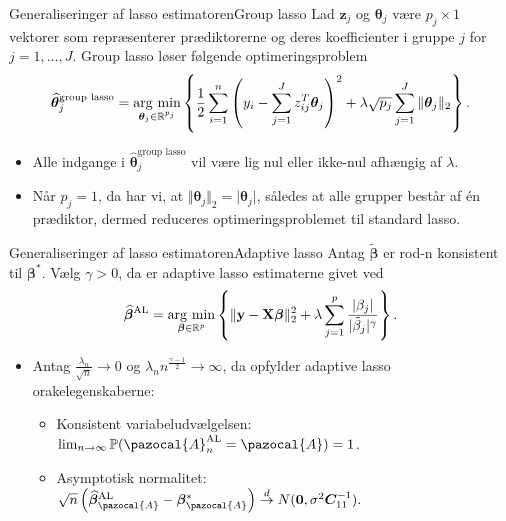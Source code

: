 \begin{frame}{Generaliseringer af lasso estimatoren}{Group lasso}
Lad \(\mathbf{z}_j\) og \(\boldsymbol{\theta}_j\) være \(p_j \times 1\) vektorer som repræsenterer prædiktorerne og deres koefficienter i gruppe \(j\) for \(j = 1, \ldots, J\).
Group lasso løser følgende optimeringsproblem
\begin{align*}
\widehat{\boldsymbol{\theta}}_j^{\text{group lasso}} = \argmin_{\boldsymbol{\theta}_j \in \R^{p_j}} \cbr{\frac{1}{2} \sum_{i=1}^n \del{y_i - \sum_{j=1}^J z_{ij}^T \boldsymbol{\theta}_j}^2 + \lambda \sqrt{p_j} \sum_{j=1}^J \Vert \boldsymbol{\theta}_j \Vert_2}.
\end{align*}
\begin{itemize}
\item Alle indgange i $\widehat{\boldsymbol{\theta}}_j^\text{group lasso}$ vil være lig nul eller ikke-nul afhængig af \(\lambda\).
\item Når $p_j=1$, da har vi, at $\Vert \boldsymbol{\theta}_j \Vert_2 = \vert \boldsymbol{\theta}_j \vert$, således at alle grupper består af én prædiktor, dermed reduceres optimeringsproblemet til standard lasso.
\end{itemize}
\end{frame}
%
\begin{frame}{Generaliseringer af lasso estimatoren}{Adaptive lasso}
Antag \(\boldsymbol{\tilde{\beta}}\) er rod-n konsistent til \(\boldsymbol{\beta}^*\). Vælg \(\gamma >0\), da er adaptive lasso estimaterne givet ved
\begin{align*}
\widehat{\boldsymbol{\beta}}^\text{AL} = \argmin_{\boldsymbol{\beta} \in \R^p} \cbr{ \Vert \mathbf{y} - \mathbf{X} \boldsymbol{\beta} \Vert_2^2 + \lambda \sum_{j=1}^p \frac{ \vert \beta_j \vert}{\vert \tilde{\beta}_j \vert^\gamma}}.
\end{align*}
\begin{itemize}
\item Antag $\frac{\lambda_n}{\sqrt{n}} \rightarrow 0$ og $\lambda_n n^\frac{\gamma-1}{2} \rightarrow \infty$, da opfylder adaptive lasso orakelegenskaberne:
\begin{itemize}
\item Konsistent variabeludvælgelsen: $\lim_{n \rightarrow \infty} \mathbb{P}(\pazocal{A}_n^\text{AL}=\pazocal{A})=1$.
\item Asymptotisk normalitet: $\sqrt{n}\left( \widehat{\boldsymbol{\beta}}_\pazocal{A}^{\text{AL}}-\boldsymbol{\beta}_\pazocal{A}^* \right) \overset{d}{\rightarrow} N(\textbf{0},\sigma^2 \boldsymbol{C}_{11}^{-1}).$
\end{itemize} 
\end{itemize} 
\end{frame}

